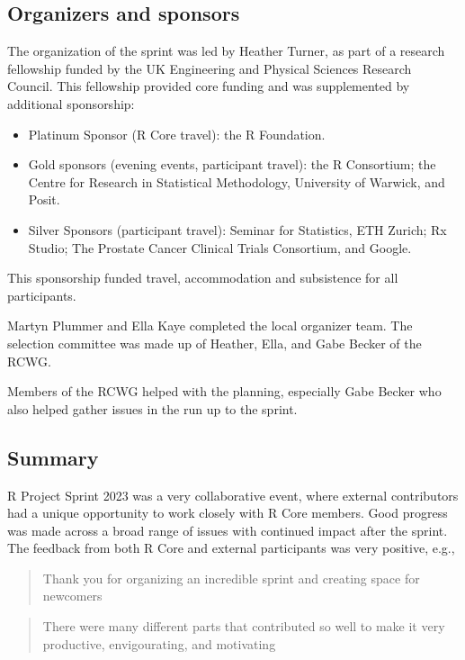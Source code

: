 \hypertarget{organizers-and-sponsors}{%
\subsection{Organizers and sponsors}\label{organizers-and-sponsors}}

The organization of the sprint was led by Heather Turner, as part of a
research fellowship funded by the UK Engineering and Physical Sciences Research Council. This fellowship provided core funding and was supplemented by additional sponsorship:

\begin{itemize}
\tightlist
\item
  Platinum Sponsor (R Core travel): the R Foundation.
\item
  Gold sponsors (evening events, participant travel): the R Consortium; the Centre for Research in Statistical Methodology, University of Warwick, and Posit.
\item
  Silver Sponsors (participant travel): Seminar for Statistics, ETH Zurich; Rx Studio; The Prostate Cancer Clinical Trials Consortium, and Google.
\end{itemize}

\noindent
This sponsorship funded travel, accommodation and subsistence for all participants.

Martyn Plummer and Ella Kaye completed the local organizer team. The selection committee was made up of Heather, Ella, and Gabe Becker of the RCWG.

Members of the RCWG helped with the planning, especially Gabe Becker who also helped gather issues in the run up to the sprint.

\hypertarget{summary}{%
\subsection{Summary}\label{summary}}

R Project Sprint 2023 was a very collaborative event, where external contributors had a unique opportunity to work closely with R Core members. Good progress was made across a broad range of issues with continued impact after the sprint. The feedback from both R Core and external participants was very positive, e.g.,

\begin{quote}
Thank you for organizing an incredible sprint and creating space for newcomers
\end{quote}

\begin{quote}
There were many different parts that contributed so well to
make it very productive, envigourating, and motivating
\end{quote}

